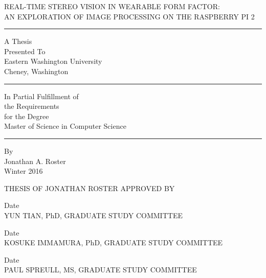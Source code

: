 \documentclass[chapterprefix=false, 12pt]{scrreprt}
\begin{document}
\doublespace
\thispagestyle{empty}
\begin{center}
	REAL-TIME STEREO VISION IN WEARABLE FORM FACTOR:\\ AN EXPLORATION OF IMAGE PROCESSING ON THE RASPBERRY PI 2
\end{center}
\hrule
\begin{center}
	A Thesis\\
	Presented To\\
	Eastern Washington University\\
	Cheney, Washington\\
\end{center}
\hrule
\begin{center}
	In Partial Fulfillment of \\
	the Requirements\\
	for the Degree \\
	Master of Science in Computer Science\\
\end{center}
	\hrule
\begin{center}
	By \\
	Jonathan A. Roster\\
	Winter 2016
\end{center}
\newpage
\vspace{.75in}
\begin{center}
THESIS OF JONATHAN ROSTER APPROVED BY
\end{center}
\vspace{1.5in}
\begin{center}
\makebox[3in]{\hrulefill} Date\makebox[1.0in]{\hrulefill}\\
YUN TIAN, PhD, GRADUATE STUDY COMMITTEE

\vspace{.75in}

\makebox[3in]{\hrulefill} Date\makebox[1.0in]{\hrulefill}\\
KOSUKE IMMAMURA, PhD, GRADUATE STUDY COMMITTEE

\vspace{.75in}

\makebox[3in]{\hrulefill} Date\makebox[1.0in]{\hrulefill}\\
PAUL SPREULL, MS, GRADUATE STUDY COMMITTEE
\end{center}
\end{document}
